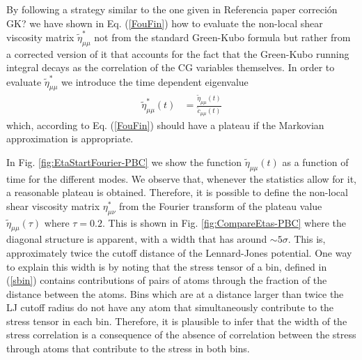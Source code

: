 \documentclass[a4paper,openright,12pt]{book}
\newcommand{\Pendiente}[1]{{\color{green}#1}} %
\begin{document}
By following a  strategy similar to the one given  in \Pendiente{Referencia paper correción GK?} we
have shown in  Eq. (\ref{FouFin}) how to evaluate  the non-local shear
viscosity  matrix  $\tilde{\eta}^*_{\mu\mu}$  not  from  the  standard
Green-Kubo  formula but  rather from  a corrected  version of  it that
accounts for the  fact that the Green-Kubo running  integral decays as
the correlation of  the CG variables themselves. In  order to evaluate
$\tilde{\eta}^*_{\mu\mu}$ we introduce the time dependent eigenvalue
\begin{align}
\tilde{\eta}_{\mu\mu}^*(t)&=\frac{\tilde{\eta}_{\mu\mu}(t) }{\tilde{c}_{\mu\mu}(t)}
\label{FouFint}
\end{align}
which, according  to Eq. (\ref{FouFin})  should have a plateau  if the
Markovian approximation is appropriate.

In    Fig.      \ref{fig:EtaStartFourier-PBC}    we    show     the    function
$\tilde{\eta}_{\mu\mu}(t)$  as a  function of  time for  the different
modes.   We observe  that, whenever  the  statistics allow  for it,  a
reasonable plateau  is obtained. Therefore,  it is possible  to define
the  non-local  shear  viscosity  matrix  $\eta^*_{\mu\nu}$  from  the
Fourier transform  of the plateau  value $\tilde{\eta}_{\mu\mu}(\tau)$
where $\tau=0.2$.  This  is shown in Fig.  \ref{fig:CompareEtas-PBC} where the
diagonal structure  is apparent,  with a width  that has  around $\sim
5\sigma$.  This  is, approximately  twice the  cutoff distance  of the
Lennard-Jones potential.  One way to  explain this width is  by noting
that  the stress  tensor of  a bin,  defined in  (\ref{sbin}) contains
contributions of pairs  of atoms through the fraction  of the distance
between the atoms. Bins which are  at a distance larger than twice the
LJ cutoff radius  do not have any atom  that simultaneously contribute
to the stress tensor in each  bin. Therefore, it is plausible to infer
that the width of the stress correlation is a consequence of the absence
of correlation between the stress through atoms that contribute to the stress
in both bins.
\end{document}
